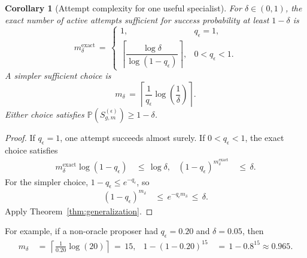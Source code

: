 \documentclass{article} %
\newtheorem{corollary}[theorem]{Corollary}
\begin{document}
\begin{corollary}[Attempt complexity for one useful specialist]
\label{cor:app-specialist-sample}
For \(\delta\in(0,1)\), the exact number of active attempts sufficient for
success probability at least \(1-\delta\) is
\begin{equation}
m_{\delta}^{\mathrm{exact}}
\,=\,
\begin{cases}
1, & q_\epsilon=1,\\[1mm]
\left\lceil
\dfrac{\log \delta}{\log(1-q_{\epsilon})}
\right\rceil, & 0<q_\epsilon<1.
\end{cases}
\end{equation}
A simpler sufficient choice is
\begin{equation}
m_{\delta}
\,=\,
\left\lceil
\frac{1}{q_{\epsilon}}
\log\!\left(\frac{1}{\delta}\right)
\right\rceil .
\end{equation}
Either choice satisfies
\(\mathbb P(S_{g,m}^{(\epsilon)})\geq1-\delta\).
\end{corollary}

\begin{proof}
If \(q_\epsilon=1\), one attempt succeeds almost surely.  If
\(0<q_\epsilon<1\), the exact choice satisfies
\begin{equation}
\begin{aligned}
m_{\delta}^{\mathrm{exact}}
\log(1-q_{\epsilon})
&\,\leq\,\log \delta, &
(1-q_{\epsilon})^{m_{\delta}^{\mathrm{exact}}}
&\,\leq\,\delta.
\end{aligned}
\end{equation}
For the simpler choice, \(1-q_\epsilon\leq e^{-q_\epsilon}\), so
\begin{equation}
\begin{aligned}
(1-q_{\epsilon})^{m_{\delta}}
&\,\leq\,e^{-q_\epsilon m_\delta}
\,\leq\,\delta.
\end{aligned}
\end{equation}
Apply Theorem~\ref{thm:generalization}.
\end{proof}

For example, if a non-oracle proposer had \(q_\epsilon=0.20\) and
\(\delta=0.05\), then
\begin{equation}
\begin{aligned}
m_{\delta}
&\,=\,
\left\lceil
\frac{1}{0.20}\log(20)
\right\rceil
\,=\,15, &
1-(1-0.20)^{15}
&\,=\,1-0.8^{15}
\approx0.965.
\end{aligned}
\end{equation}
\end{document}
